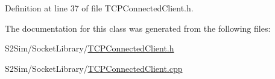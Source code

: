 Definition at line 37 of file T\-C\-P\-Connected\-Client.\-h.



The documentation for this class was generated from the following files\-:\begin{DoxyCompactItemize}
\item 
S2\-Sim/\-Socket\-Library/\hyperlink{_t_c_p_connected_client_8h}{T\-C\-P\-Connected\-Client.\-h}\item 
S2\-Sim/\-Socket\-Library/\hyperlink{_t_c_p_connected_client_8cpp}{T\-C\-P\-Connected\-Client.\-cpp}\end{DoxyCompactItemize}
